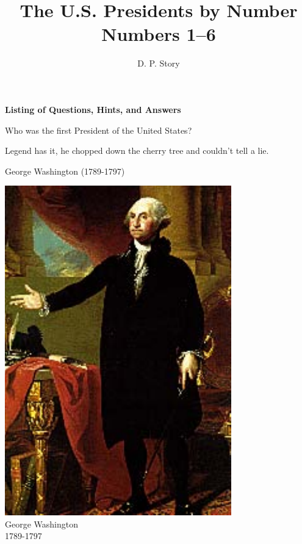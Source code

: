 \documentclass{article}
\author{D. P. Story}
\title{The U.S. Presidents by Number\texorpdfstring{\\}{,} Numbers 1--6}
\def\rescale{.4} %
\begin{document}
\maketitle

\ifecListing
    \begin{center}\Large\bfseries
        Listing of Questions, Hints, and Answers
    \end{center}\bigskip
\fi

\begin{card}
    Who was the first President of the United States?
    \begin{response}
        \begin{hint}
            Legend has it, he chopped down the cherry tree and couldn't tell a lie.
        \end{hint}
        \begin{answer}
        \ifecListing
            George Washington (1789-1797)
        \else
            \begin{center}
                \includegraphics[scale=\rescale]{presidents/gw1}\\
                    George Washington\\
                    1789-1797
            \end{center}
        \fi
        \end{answer}
    \end{response}
\end{card}
\end{document}
